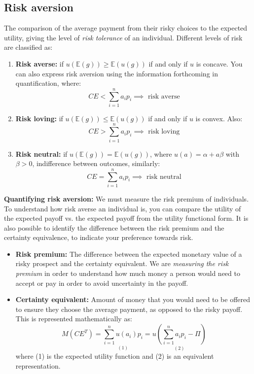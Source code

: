 \documentclass{article}
\begin{document}
\subsection{Risk aversion}
The comparison of the average payment from their risky choices to the expected utility, giving the level of \textit{risk tolerance} of an individual. Different levels of risk are classified as:
\begin{enumerate}
    \item \textbf{Risk averse:} if $u(\mathbb{E}(g)) \geq \mathbb{E}(u(g))$ if and only if $u$ is concave. You can also express risk aversion using the information forthcoming in quantification, where: \[
    CE < \sum_{i=1}^{n}a_ip_i \implies \text{ risk averse}
    \]
    \item \textbf{Risk loving:} if $u(\mathbb{E}(g)) \leq \mathbb{E}(u(g))$ if and only if $u$ is convex. Also: \[
    CE > \sum_{i=1}^{n}a_ip_i \implies \text{ risk loving}
    \]
    \item \textbf{Risk neutral:} if $u(\mathbb{E}(g)) = \mathbb{E}(u(g))$, where $u(a) = \alpha +a\beta$ with $\beta > 0$, indifference between outcomes, similarly: \[
    CE = \sum_{i=1}^{n}a_ip_i \implies \text{ risk neutral}
    \]
\end{enumerate}

\noindent \textbf{Quantifying risk aversion:} We must measure the risk premium of individuals. To understand how risk averse an individual is, you can compare the utility of the expected payoff vs. the expected payoff from the utility functional form. It is also possible to identify the difference between the risk premium and the certainty equivalence, to indicate your preference towards risk. 
\begin{itemize}
    \item \textbf{Risk premium:} The difference between the expected monetary value of a risky prospect and the certainty equivalent. We are \textit{measuring the risk premium} in order to understand how much money a person would need to accept or pay in order to avoid uncertainty in the payoff.
    \item \textbf{Certainty equivalent:} Amount of money that you would need to be offered to ensure they choose the average payment, as opposed to the risky payoff. This is represented mathematically as: 
    \[
    M(CE^T) = \underset{(1)}{\sum_{i=1}^{n}u(a_i)p_i} = \underset{(2)}{u\left(\sum_{i=1}^{n}a_ip_i - \Pi\right)}
    \] where (1) is the expected utility function and (2) is an equivalent representation. 
\end{itemize}
\end{document}
